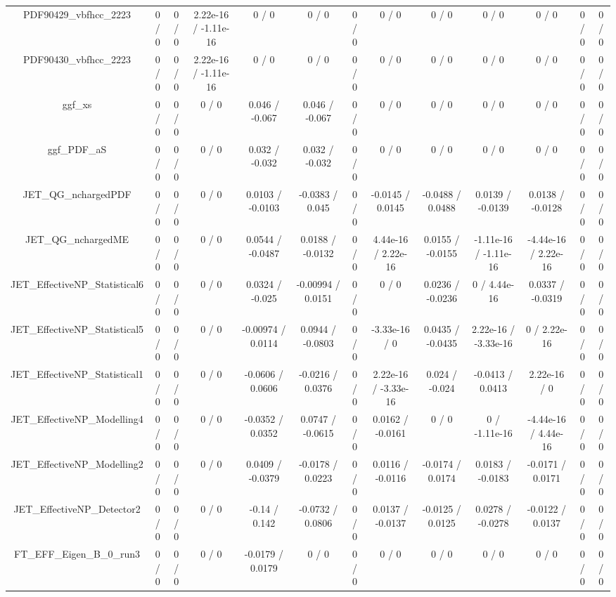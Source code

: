 \documentclass[10pt]{article}
\begin{document}
\begin{table}[htbp]
\begin{center}
\begin{tabular}{|c|c|c|c|c|c|c|c|c|c|c|c|c|}
  PDF90429_vbfhcc_2223 & 0 / 0 & 0 / 0 & 2.22e-16 / -1.11e-16 & 0 / 0 & 0 / 0 & 0 / 0 & 0 / 0 & 0 / 0 & 0 / 0 & 0 / 0 & 0 / 0 & 0 / 0 \\ 
  PDF90430_vbfhcc_2223 & 0 / 0 & 0 / 0 & 2.22e-16 / -1.11e-16 & 0 / 0 & 0 / 0 & 0 / 0 & 0 / 0 & 0 / 0 & 0 / 0 & 0 / 0 & 0 / 0 & 0 / 0 \\ 
  ggf_xs & 0 / 0 & 0 / 0 & 0 / 0 & 0.046 / -0.067 & 0.046 / -0.067 & 0 / 0 & 0 / 0 & 0 / 0 & 0 / 0 & 0 / 0 & 0 / 0 & 0 / 0 \\ 
  ggf_PDF_aS & 0 / 0 & 0 / 0 & 0 / 0 & 0.032 / -0.032 & 0.032 / -0.032 & 0 / 0 & 0 / 0 & 0 / 0 & 0 / 0 & 0 / 0 & 0 / 0 & 0 / 0 \\ 
  JET_QG_nchargedPDF & 0 / 0 & 0 / 0 & 0 / 0 & 0.0103 / -0.0103 & -0.0383 / 0.045 & 0 / 0 & -0.0145 / 0.0145 & -0.0488 / 0.0488 & 0.0139 / -0.0139 & 0.0138 / -0.0128 & 0 / 0 & 0 / 0 \\ 
  JET_QG_nchargedME & 0 / 0 & 0 / 0 & 0 / 0 & 0.0544 / -0.0487 & 0.0188 / -0.0132 & 0 / 0 & 4.44e-16 / 2.22e-16 & 0.0155 / -0.0155 & -1.11e-16 / -1.11e-16 & -4.44e-16 / 2.22e-16 & 0 / 0 & 0 / 0 \\ 
  JET_EffectiveNP_Statistical6 & 0 / 0 & 0 / 0 & 0 / 0 & 0.0324 / -0.025 & -0.00994 / 0.0151 & 0 / 0 & 0 / 0 & 0.0236 / -0.0236 & 0 / 4.44e-16 & 0.0337 / -0.0319 & 0 / 0 & 0 / 0 \\ 
  JET_EffectiveNP_Statistical5 & 0 / 0 & 0 / 0 & 0 / 0 & -0.00974 / 0.0114 & 0.0944 / -0.0803 & 0 / 0 & -3.33e-16 / 0 & 0.0435 / -0.0435 & 2.22e-16 / -3.33e-16 & 0 / 2.22e-16 & 0 / 0 & 0 / 0 \\ 
  JET_EffectiveNP_Statistical1 & 0 / 0 & 0 / 0 & 0 / 0 & -0.0606 / 0.0606 & -0.0216 / 0.0376 & 0 / 0 & 2.22e-16 / -3.33e-16 & 0.024 / -0.024 & -0.0413 / 0.0413 & 2.22e-16 / 0 & 0 / 0 & 0 / 0 \\ 
  JET_EffectiveNP_Modelling4 & 0 / 0 & 0 / 0 & 0 / 0 & -0.0352 / 0.0352 & 0.0747 / -0.0615 & 0 / 0 & 0.0162 / -0.0161 & 0 / 0 & 0 / -1.11e-16 & -4.44e-16 / 4.44e-16 & 0 / 0 & 0 / 0 \\ 
  JET_EffectiveNP_Modelling2 & 0 / 0 & 0 / 0 & 0 / 0 & 0.0409 / -0.0379 & -0.0178 / 0.0223 & 0 / 0 & 0.0116 / -0.0116 & -0.0174 / 0.0174 & 0.0183 / -0.0183 & -0.0171 / 0.0171 & 0 / 0 & 0 / 0 \\ 
  JET_EffectiveNP_Detector2 & 0 / 0 & 0 / 0 & 0 / 0 & -0.14 / 0.142 & -0.0732 / 0.0806 & 0 / 0 & 0.0137 / -0.0137 & -0.0125 / 0.0125 & 0.0278 / -0.0278 & -0.0122 / 0.0137 & 0 / 0 & 0 / 0 \\ 
  FT_EFF_Eigen_B_0_run3 & 0 / 0 & 0 / 0 & 0 / 0 & -0.0179 / 0.0179 & 0 / 0 & 0 / 0 & 0 / 0 & 0 / 0 & 0 / 0 & 0 / 0 & 0 / 0 & 0 / 0 \\ 

\end{tabular}
\end{center}
\end{table}
\end{document}
